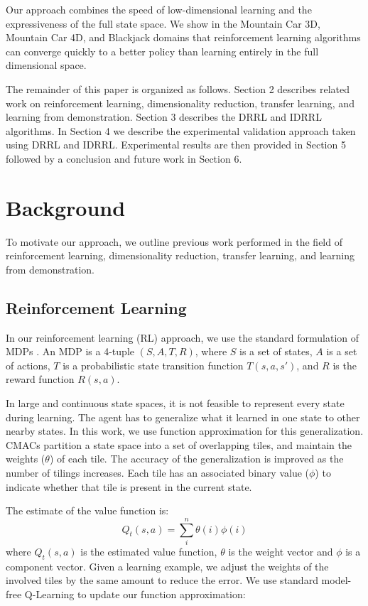 \documentclass[10pt,a4paper]{article}
\begin{document}
Our approach combines the speed of low-dimensional learning and the expressiveness of the full state space.  We show in the Mountain Car 3D, Mountain Car 4D, and Blackjack domains that reinforcement learning algorithms can converge quickly to a better policy than learning entirely in the full dimensional space.

The remainder of this paper is organized as follows. Section 2 describes related work on reinforcement learning, dimensionality reduction, transfer learning, and learning from demonstration. Section 3 describes the DRRL and IDRRL algorithms. In Section 4 we describe the experimental validation approach taken using DRRL and IDRRL. Experimental results are then provided in Section 5 followed by a conclusion and future work in Section 6.

\section{Background}
To motivate our approach, we outline previous work performed in the field of reinforcement learning, dimensionality reduction, transfer learning, and learning from demonstration.

\subsection{Reinforcement Learning}
In our reinforcement learning (RL) approach, we use the standard formulation of MDPs \cite{Kaelbling:1996:RLS:1622737.1622748}. An MDP is a 4-tuple $(S,A,T,R)$, where $S$ is a set of states, $A$ is a set of actions, $T$ is a probabilistic state transition function $T(s,a,s')$, and $R$ is the reward function $R(s,a)$. 

In large and continuous state spaces, it is not feasible to represent every state during learning. The agent has to generalize what it learned in one state to other nearby states. In this work, we use function approximation for this generalization. CMACs \cite{brains-behavior-robotics} partition a state space into a set of overlapping tiles, and maintain the weights ($\theta$) of each tile. The accuracy of the generalization is improved as the number of tilings increases. Each tile has an associated binary value ($\phi$) to indicate whether that tile is present in the current state. 

The estimate of the value function is:
\begin{equation}
Q_t(s,a) = \sum_i^n \theta(i)\phi(i)
\end{equation}
where $Q_t(s,a)$ is the estimated value function, $\theta$ is the weight vector and $\phi$ is a component vector. Given a learning example, we adjust the weights of the involved tiles by the same amount to reduce the error. We use standard model-free Q-Learning to update our function approximation:
\end{document}
